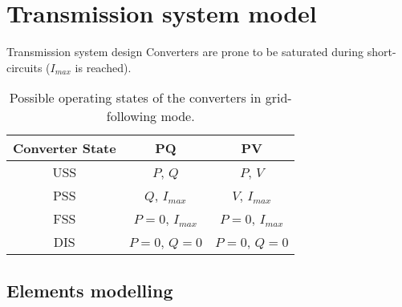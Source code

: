 \section{Transmission system model}


\begin{frame}{}
    \tableofcontents[currentsection]
\end{frame}



\begin{frame}{Transmission system design}
  Converters are prone to be saturated during short-circuits ($I_{max}$ is reached). 

\begin{table}[!htb]\centering
  \caption{Possible operating states of the converters in grid-following mode.}
  \begin{tabular}{ccc}
    \hline
    \textbf{Converter State} & \textbf{PQ} & \textbf{PV} \\
    \hline
    \hline
    USS & $P$, $Q$ & $P$, $V$ \\
    PSS & $Q$, $I_{max}$ & $V$, $I_{max}$ \\
    FSS & $P=0$, $I_{max}$ & $P=0$, $I_{max}$ \\
    DIS & $P=0$, $Q=0$ & $P=0$, $Q=0$ \\
    \hline
  \end{tabular}
  \label{tab:convs1}
\end{table}

\end{frame}

\subsection{Elements modelling}


